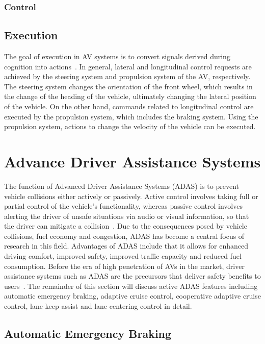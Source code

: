 \documentclass{article}
\begin{document}
\subsubsection{Control}


\subsection{Execution}

The goal of execution in AV systems is to convert signals derived during cognition into actions~\cite{Naoki2014}. In general, lateral and longitudinal control requests are achieved by the steering system and propulsion system of the AV, respectively. The steering system changes the orientation of the front wheel, which results in the change of the heading of the vehicle, ultimately  changing the lateral position of the vehicle. On the other hand, commands related to longitudinal control are executed by the propulsion system, which includes the braking system. Using the propulsion system, actions to change the velocity of the vehicle can be executed.


\section{Advance Driver Assistance Systems}

The function of Advanced Driver Assistance Systems (ADAS) is to prevent vehicle collisions either actively or passively. Active control involves taking full or partial control of the vehicle’s functionality, whereas passive control involves alerting the driver of unsafe situations via audio or visual information, so that the driver can mitigate a collision~\cite{Emre2012}. Due to the consequences posed by  vehicle collisions, fuel economy and congestion, ADAS has become a central focus of research in this field. Advantages of ADAS include that it allows  for enhanced driving comfort, improved safety, improved traffic capacity and reduced fuel consumption. Before the era of high penetration of AVs in the market, driver assistance systems such as ADAS are the precursors that deliver safety benefits to users~\cite{Utriainen2020}. The remainder of this section will discuss active ADAS features including automatic emergency braking, adaptive cruise control, cooperative adaptive cruise control, lane keep assist and lane centering control  in detail.

\subsection{Automatic Emergency Braking}
\end{document}
